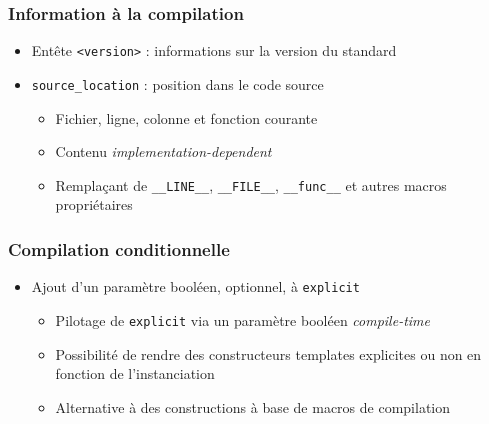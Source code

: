 \documentclass[C++.tex]{subfiles}
\begin{document}
\begin{frame}[fragile]
	\frametitle{Information à la compilation}
	\begin{itemize}
		\item Entête \lstinline|<version>| : informations sur la version du standard
		\item \lstinline|source_location| : position dans le code source
		\begin{itemize}
			\item Fichier, ligne, colonne et fonction courante
			\item Contenu \textit{implementation-dependent}


			\item Remplaçant de \lstinline|__LINE__|, \lstinline|__FILE__|, \lstinline|__func__| et autres macros propriétaires
		\end{itemize}
	\end{itemize}
\end{frame}

\begin{frame}[fragile]
	\frametitle{Compilation conditionnelle}
	\begin{itemize}
		\item Ajout d'un paramètre booléen, optionnel, à \lstinline|explicit|
		\begin{itemize}
			\item Pilotage de \lstinline|explicit| via un paramètre booléen \textit{compile-time}
			\item Possibilité de rendre des constructeurs templates explicites ou non en fonction de l'instanciation
			\item Alternative à des constructions à base de macros de compilation
		\end{itemize}
	\end{itemize}
\end{frame}
\end{document}
